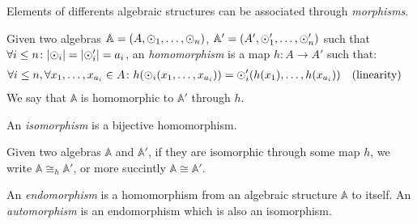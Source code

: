 Elements of differents algebraic structures can be associated through \emph{morphisms}.
\begin{definition}[Homomorphism]
  Given two algebras \(\mathbb{A} = \left(A, \odot_{1}, \dots, \odot_{n}\right)\), 
  \(\mathbb{A}' = \left(A', \odot'_{1}, \dots, \odot'_{n}\right)\) such that 
  \(\forall i \le n\colon \abs{\odot_i} = \abs{\odot'_i} = a_i\), an \emph{homomorphism} is a map 
  \(h\colon A \to A'\) such that:
  \begin{align*}
    & \forall i \le n, \forall x_1,\dots, x_{a_{i}} \in A\colon 
    h(\odot_{i}(x_{1}, \dots, x_{a_{i}})) = \odot'_{i}(h(x_{1}), \dots, h(x_{a_{i}})) && 
    \textnormal{(linearity)}
  \end{align*}
  We say that \(\mathbb{A}\) is homomorphic to \(\mathbb{A}'\) through \(h\).
\end{definition}

\begin{definition}[Isomorphism]
  An \emph{isomorphism} is a bijective homomorphism.
\end{definition}

Given two algebras \(\mathbb{A}\) and \(\mathbb{A}'\), if they are isomorphic through some map
\(h\), we write \(\mathbb{A} \cong_h \mathbb{A}'\), or more succintly \(\mathbb{A} \cong \mathbb{A}'\).

\begin{definition}
  An \emph{endomorphism} is a homomorphism from an algebraic structure \(\mathbb{A}\) to itself.
  An \emph{automorphism} is an endomorphism which is also an isomorphism.
\end{definition}

